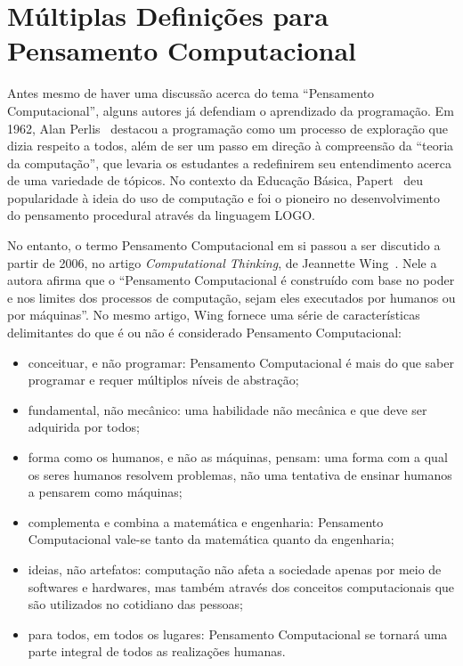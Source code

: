 \section{Múltiplas Definições para Pensamento Computacional} \label{sec:definicao_pc}

Antes mesmo de haver uma discussão acerca do tema “Pensamento Computacional”, alguns autores já defendiam o aprendizado da programação. Em 1962, Alan Perlis~\cite{guzdial_paving_2008} destacou  a programação como um processo de exploração que dizia respeito a todos, além de ser um passo em direção à compreensão da “teoria da computação”, que levaria os estudantes a redefinirem seu entendimento acerca de uma variedade de tópicos. No contexto da Educação Básica, Papert~\cite{papert1994children} deu popularidade à ideia do uso de computação e foi o pioneiro no desenvolvimento do pensamento procedural através da linguagem LOGO.

No entanto, o termo Pensamento Computacional em si passou a ser discutido a partir de 2006, no artigo \textit{Computational Thinking}, de Jeannette Wing~\cite{wing_computational_2006}. Nele a autora afirma que o “Pensamento Computacional é construído com base no poder e nos limites dos processos de computação, sejam eles executados por humanos ou por máquinas”. No mesmo artigo, Wing fornece uma série de características delimitantes do que é ou não é considerado Pensamento Computacional: 

\begin{itemize}
\item conceituar, e não programar: Pensamento Computacional é mais do que saber programar e requer múltiplos níveis de abstração;
\item fundamental, não mecânico: uma habilidade não mecânica e que deve ser adquirida por todos;
\item forma como os humanos, e não as máquinas, pensam:  uma forma com a qual os seres humanos resolvem problemas, não uma tentativa de ensinar humanos a pensarem como máquinas;
\item complementa e combina a matemática e engenharia: Pensamento Computacional vale-se tanto da matemática quanto da engenharia;
\item ideias, não artefatos: computação não afeta a sociedade apenas por meio de softwares e hardwares, mas também através dos conceitos computacionais que são utilizados no cotidiano das pessoas;
\item para todos, em todos os lugares: Pensamento Computacional se tornará uma parte integral de todos as realizações humanas.
\end{itemize}

